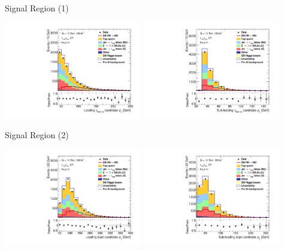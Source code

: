 \documentclass[11pt, xcolor={dvipsnames}, aspectratio=169]{beamer}
\begin{document}
\begin{frame}{Signal Region (1)}
  \centering

  \includegraphics[width=0.45\textwidth]{sr_postfit/Region_BMin0_incJet1_distTau0Pt_J2_Y2015_DLLOS_T2_SpcTauHH_L0_GlobalFit_conditionnal_mu0}%
  \hfill%
  \includegraphics[width=0.45\textwidth]{sr_postfit/Region_BMin0_incJet1_distTau1Pt_J2_Y2015_DLLOS_T2_SpcTauHH_L0_GlobalFit_conditionnal_mu0}
\end{frame}


\begin{frame}{Signal Region (2)}
  \centering

  \includegraphics[width=0.45\textwidth]{sr_postfit/Region_BMin0_incJet1_distpTB0_J2_Y2015_DLLOS_T2_SpcTauHH_L0_GlobalFit_conditionnal_mu0}%
  \hfill%
  \includegraphics[width=0.45\textwidth]{sr_postfit/Region_BMin0_incJet1_distpTB1_J2_Y2015_DLLOS_T2_SpcTauHH_L0_GlobalFit_conditionnal_mu0}
\end{frame}
\end{document}
